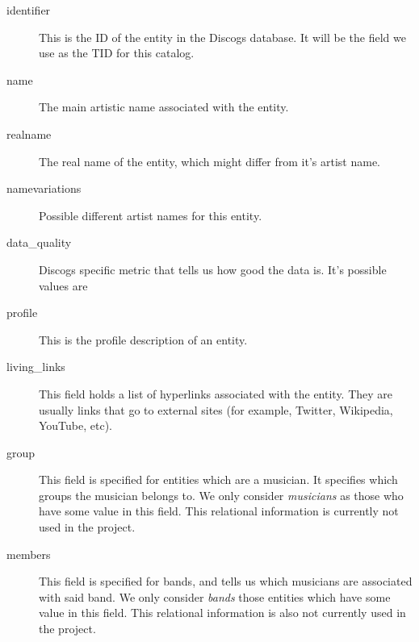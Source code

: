 \documentclass[epsfig,a4paper,11pt,titlepage,twoside,openany]{book}
\begin{document}
\begin{description}
\item[identifier] This is the ID of the entity in the Discogs database. It will be the field we use as the TID for this catalog.

\item[name] The main artistic name associated with the entity.

\item[realname] The real name of the entity, which might differ from it's artist name.

\item[namevariations] Possible different artist names for this entity.

\item[data\_quality] Discogs specific metric that tells us how good the data is. It's possible values are 

\item[profile] This is the profile description of an entity.

\item[living\_links] This field holds a list of hyperlinks associated with the entity. They are usually links that go to external sites (for example, Twitter, Wikipedia, YouTube, etc).

\item[group] This field is specified for entities which are a musician. It specifies which groups the musician belongs to. We only consider \textit{musicians} as those who have some value in this field. This relational information is currently not used in the project. 

\item[members] This field is specified for bands, and tells us which musicians are associated with said band. We only consider \textit{bands} those entities which have some value in this field. This relational information is also not currently used in the project.

\end{description}
\end{document}
